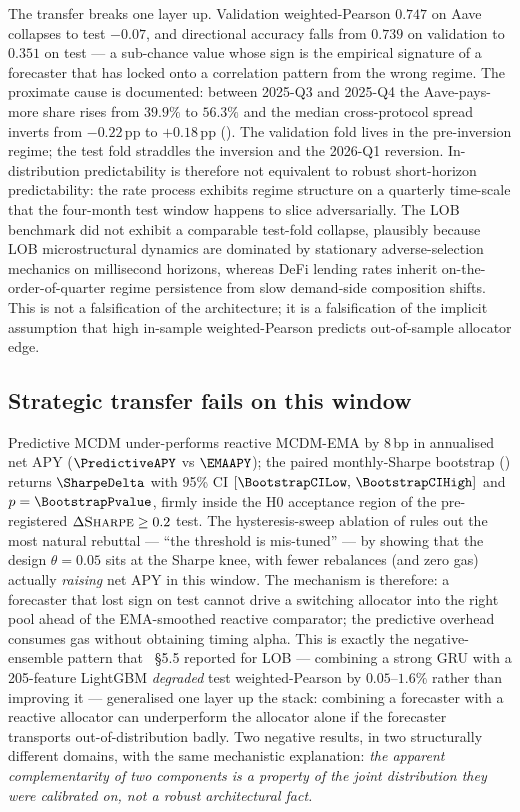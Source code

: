 The transfer breaks one layer up.  Validation weighted-Pearson $0.747$
on Aave collapses to test $-0.07$, and directional accuracy falls from
$0.739$ on validation to $0.351$ on test --- a sub-chance value whose
sign is the empirical signature of a forecaster that has locked onto a
correlation pattern from the wrong regime.  The proximate cause is
documented: between 2025-Q3 and 2025-Q4 the Aave-pays-more share rises
from $39.9\%$ to $56.3\%$ and the median cross-protocol spread inverts
from $-0.22$\,pp to $+0.18$\,pp ().  The
validation fold lives in the pre-inversion regime; the test fold
straddles the inversion and the 2026-Q1 reversion.  In-distribution
predictability is therefore not equivalent to robust short-horizon
predictability: the rate process exhibits regime structure on a
quarterly time-scale that the four-month test window happens to slice
adversarially.  The LOB benchmark \cite{solovev2026lob} did not exhibit
a comparable test-fold collapse, plausibly because LOB
microstructural dynamics are dominated by stationary
adverse-selection mechanics on millisecond horizons, whereas DeFi
lending rates inherit on-the-order-of-quarter regime persistence from
slow demand-side composition shifts.  This is not a falsification of
the architecture; it is a falsification of the implicit assumption
that high in-sample weighted-Pearson predicts out-of-sample
allocator edge.

\subsection{Strategic transfer fails on this window}
\label{sec:disc-strat}

Predictive MCDM under-performs reactive MCDM-EMA by $8$\,bp in
annualised net APY ($\PredictiveAPY$ vs $\EMAAPY$); the paired
monthly-Sharpe bootstrap () returns
$\SharpeDelta$ with 95\% CI $[\BootstrapCILow,\,\BootstrapCIHigh]$
and $p=\BootstrapPvalue$, firmly inside the H0 acceptance region of
the pre-registered $\Delta\textsc{Sharpe}\ge 0.2$ test.  The
hysteresis-sweep ablation of  rules out the
most natural rebuttal --- ``the threshold is mis-tuned'' --- by
showing that the design $\theta=0.05$ sits at the Sharpe knee, with
fewer rebalances (and zero gas) actually \emph{raising} net APY in
this window.  The mechanism is therefore: a forecaster that lost
sign on test cannot drive a switching allocator into the right pool
ahead of the EMA-smoothed reactive comparator; the predictive
overhead consumes gas without obtaining timing alpha.  This is
exactly the negative-ensemble pattern that
\cite{solovev2026lob}~\S5.5 reported for LOB --- combining a strong
GRU with a 205-feature LightGBM \emph{degraded} test
weighted-Pearson by $0.05$--$1.6\%$ rather than improving it ---
generalised one layer up the stack: combining a forecaster with a
reactive allocator can underperform the allocator alone if the
forecaster transports out-of-distribution badly.  Two negative
results, in two structurally different domains, with the same
mechanistic explanation: \emph{the apparent complementarity of two
components is a property of the joint distribution they were
calibrated on, not a robust architectural fact.}


